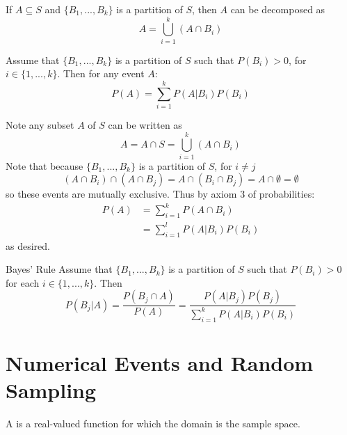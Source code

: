 \documentclass[12pt, a4paper, twoside, openright, titlepage]{book}
\begin{document}
\begin{rmk}{}{}
    If $A \subseteq S$ and $\{B_1,...,B_k\}$ is a partition of $S$, then $A$ can be decomposed as \begin{equation*}
        A = \bigcup\limits_{i=1}^k(A\cap B_i)
    \end{equation*}
\end{rmk}


\begin{thm}{}{}
    Assume that $\{B_1,...,B_k\}$ is a partition of $S$ such that $P(B_i) > 0$, for $i \in \{1,...,k\}$. Then for any event $A$:\begin{equation*}
        P(A) = \sum\limits_{i=1}^kP(A\vert B_i)P(B_i)
    \end{equation*}
\end{thm}
\begin{proof*}{}{}
    Note any subset $A$ of $S$ can be written as \begin{equation*}
        A = A\cap S = \bigcup\limits_{i=1}^k(A\cap B_i)
    \end{equation*}
    Note that because $\{B_1,...,B_k\}$ is a partition of $S$, for $i \neq j$\begin{equation*}
        (A\cap B_i)\cap(A\cap B_j) = A\cap(B_i\cap B_j) = A\cap \emptyset = \emptyset
    \end{equation*}
    so these events are mutually exclusive. Thus by axiom $3$ of probabilities: \begin{align*}
        P(A) &= \sum\limits_{i=1}^kP(A\cap B_i) \\
        &= \sum\limits_{i=1}^lP(A\vert B_i)P(B_i)
    \end{align*}
    as desired.
\end{proof*}


\begin{namthm}{Bayes' Rule}{}
    Assume that $\{B_1,...,B_k\}$ is a partition of $S$ such that $P(B_i) > 0$ for each $i \in \{1,...,k\}$. Then \begin{equation}
        P(B_j\vert A) = \frac{P(B_j\cap A)}{P(A)} = \frac{P(A\vert B_j)P(B_j)}{\sum_{i=1}^kP(A\vert B_i)P(B_i)}
    \end{equation}
\end{namthm}


\section{\textsection Numerical Events and Random Sampling}

\begin{defn}{}{}
    A  is a real-valued function for which the domain is the sample space.
\end{defn}
\end{document}
